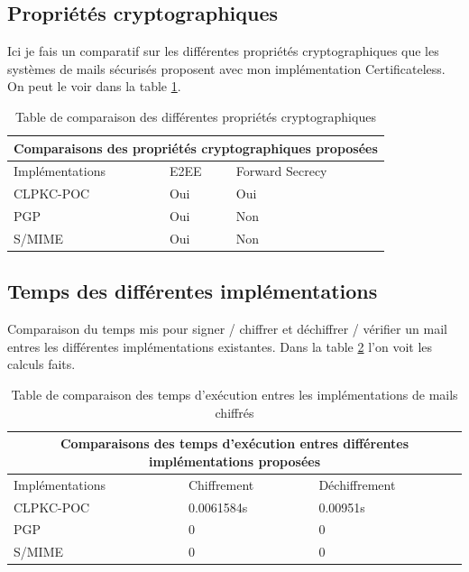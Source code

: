 \subsection{Propriétés cryptographiques}
Ici je fais un comparatif sur les différentes propriétés cryptographiques que les systèmes de mails sécurisés proposent avec mon implémentation Certificateless. On peut le voir dans la table \ref{table:comparisonProperties}.
\begin{table}[h!]
	\centering
	\begin{tabular}{ |p{3cm}||p{3cm}|p{3cm}| }
		\hline
		\multicolumn{3}{|c|}{Comparaisons des propriétés cryptographiques proposées} \\
		\hline
		Implémentations & E2EE & Forward Secrecy\\
		\hline
		CLPKC-POC   & Oui & Oui\\
		PGP & Oui & Non\\
		S/MIME & Oui & Non\\
		\hline
	\end{tabular}
	\caption{Table de comparaison des différentes propriétés cryptographiques }
	\label{table:comparisonProperties}
\end{table}
\subsection{Temps des différentes implémentations}
Comparaison du temps mis pour signer / chiffrer et déchiffrer / vérifier un mail entres les différentes implémentations existantes. Dans la table \ref{table:comparisonTime} l'on voit les calculs faits.
\begin{table}[h!]
	\centering
	\begin{tabular}{ |p{3cm}||p{3cm}|p{3cm}| }
		\hline
		\multicolumn{3}{|c|}{Comparaisons des temps d'exécution entres différentes implémentations proposées} \\
		\hline
		Implémentations & Chiffrement & Déchiffrement\\
		\hline
		CLPKC-POC   & 0.0061584s & 0.00951s\\
		PGP & 0 & 0\\
		S/MIME & 0 & 0\\
		\hline
	\end{tabular}
	\caption{Table de comparaison des temps d'exécution entres les implémentations de mails chiffrés}
	\label{table:comparisonTime}
\end{table}
